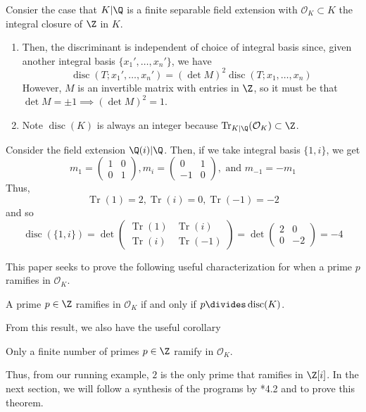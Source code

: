 \documentclass[11pt,leqno,oneside]{amsart}
\numberwithin{thm}{section}
\renewcommand{\O}{\mathcal{O}}
\newcommand{\disc}{\operatorname{disc}}
\newcommand{\Tr}{\operatorname{Tr}}
\begin{document}
\begin{rmk}
  Consier the case that \(K|\Q\) is a finite separable field extension with
  \(\O_K \subset K\) the integral closure of \(\Z\) in \(K\).
  \begin{enumerate}
  \item Then, the discriminant is independent of choice of
  integral basis since, given another integral basis \(\{x_1', \ldots,
  x_n'\}\), we have \[
    \disc(T;x_1', \ldots, x_n') = (\det M)^2 \disc(T;x_1, \ldots, x_n)
  \]
  However, \(M\) is an invertible matrix with entries in \(\Z\), so it
  must be that \(\det M = \pm 1 \implies (\det M)^2 = 1\). 
  \item Note \(\disc(K)\) is always an integer because
    \(\Tr_{K|\Q}(\O_K) \subset \Z\).
  \end{enumerate}
\end{rmk}
\begin{example}
  Consider the field extension \(\Q(i)|\Q\). Then, if we take integral basis
  \(\{1,i\}\), we get \[
    m_1 = \left(
      \begin{array}{cc}
        1&0\\
        0&1
      \end{array}
\right), m_i = \left(
  \begin{array}{cc}
    0&1\\
    -1&0
  \end{array}
\right), \text{ and } m_{-1} = -m_1
\]
Thus, \[
  \Tr(1) = 2, \Tr(i) = 0, \Tr(-1) = -2
\]
and so \[
  \disc(\{1,i\}) = \det \left(
    \begin{array}{cc}
      \Tr(1)&\Tr(i)\\
      \Tr(i)&\Tr(-1)
    \end{array}
\right) = \det \left(
  \begin{array}{cc}
    2&0\\
    0&-2
  \end{array}
\right) = -4
\]
\end{example}
This paper seeks to prove the following useful characterization for when a
prime \(p\) ramifies in \(\O_K\).
\begin{thm}\label{main-thm}
  A prime \(p \in \Z\) ramifies in \(\O_K\) if and only if \(p
  \divides \disc(K)\). 
\end{thm}
From this result, we also have the useful corollary
\begin{cor}
  Only a finite number of primes \(p \in \Z\) ramify in \(\O_K\).
\end{cor}
Thus, from our running example, \(2\) is the only prime that ramifies
in \(\Z[i]\). In the next section, we will follow a synthesis of the
programs by \cite{ash}*{4.2} and \cite{conrad} to prove this theorem.
\end{document}
